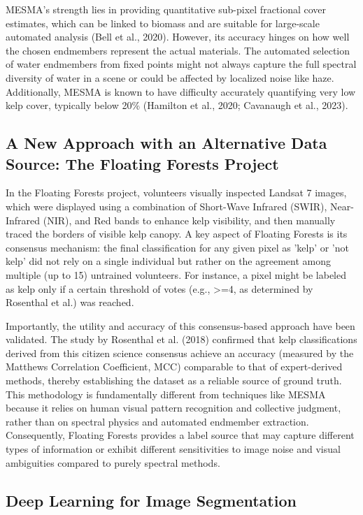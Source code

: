 \documentclass{article}
\begin{document}
MESMA's strength lies in providing quantitative sub-pixel fractional cover estimates, which can be linked to biomass and are suitable for large-scale automated analysis (Bell et al., 2020). However, its accuracy hinges on how well the chosen endmembers represent the actual materials. The automated selection of water endmembers from fixed points might not always capture the full spectral diversity of water in a scene or could be affected by localized noise like haze. Additionally, MESMA is known to have difficulty accurately quantifying very low kelp cover, typically below 20\% (Hamilton et al., 2020; Cavanaugh et al., 2023).

\subsection{A New Approach with an Alternative Data Source: The Floating Forests Project} 

In the Floating Forests project, volunteers visually inspected Landsat 7 images, which were displayed using a combination of Short-Wave Infrared (SWIR), Near-Infrared (NIR), and Red bands to enhance kelp visibility, and then manually traced the borders of visible kelp canopy. A key aspect of Floating Forests is its consensus mechanism: the final classification for any given pixel as 'kelp' or 'not kelp' did not rely on a single individual but rather on the agreement among multiple (up to 15) untrained volunteers. For instance, a pixel might be labeled as kelp only if a certain threshold of votes (e.g., >=4, as determined by Rosenthal et al.) was reached. 
       
Importantly, the utility and accuracy of this consensus-based approach have been validated. The study by Rosenthal et al. (2018) confirmed that kelp classifications derived from this citizen science consensus achieve an accuracy (measured by the Matthews Correlation Coefficient, MCC) comparable to that of expert-derived methods, thereby establishing the dataset as a reliable source of ground truth. This methodology is fundamentally different from techniques like MESMA because it relies on human visual pattern recognition and collective judgment, rather than on spectral physics and automated endmember extraction. Consequently, Floating Forests provides a label source that may capture different types of information or exhibit different sensitivities to image noise and visual ambiguities compared to purely spectral methods.

\subsection{Deep Learning for Image Segmentation} 
\end{document}
